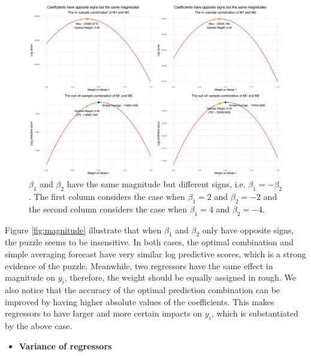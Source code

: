 \documentclass{monashthesis}
\begin{document}
\begin{figure}[ht]
\centering
\includegraphics[scale=0.55]{figures/Beta_diff_sign.png}
\caption{$\beta_1$ and $\beta_2$ have the same magnitude but different signs, i.e. $\beta_1=-\beta_2$. The first column considers the case when $\beta_1=2$ and $\beta_2=-2$ and the second column considers the case when $\beta_1=4$ and $\beta_2=-4$.}
\label{fig:sign}
\end{figure}

Figure \ref{fig:magnitude} illustrate that when \(\beta_1\) and \(\beta_2\) only have opposite signs, the puzzle seems to be insensitive. In both cases, the optimal combination and simple averaging forecast have very similar log predictive scores, which is a strong evidence of the puzzle. Meanwhile, two regressors have the same effect in magnitude on \(y_i\), therefore, the weight should be equally assigned in rough. We also notice that the accuracy of the optimal prediction combination can be improved by having higher absolute values of the coefficients. This makes regressors to have larger and more certain impacts on \(y_i\), which is substantiated by the above case.

\begin{itemize}
\tightlist
\item
  \bf{Variance of regressors}
\end{itemize}
\end{document}
